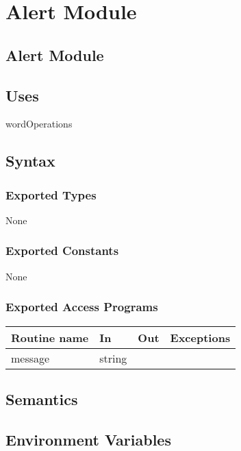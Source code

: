 \documentclass[12pt]{article}
\begin{document}
\newpage

\section {Alert Module}

\subsection* {Alert Module}

\subsection* {Uses}

wordOperations

\subsection* {Syntax}

\subsubsection* {Exported Types}

None

\subsubsection* {Exported Constants}

None

\subsubsection* {Exported Access Programs}

\begin{tabular}{| l | l | l | p{6cm} |}
\hline
\textbf{Routine name} & \textbf{In} & \textbf{Out} & \textbf{Exceptions}\\
\hline
message & string & ~ &  \\
\hline
\end{tabular}

\subsection* {Semantics}

\subsection*{Environment Variables}
\end{document}
